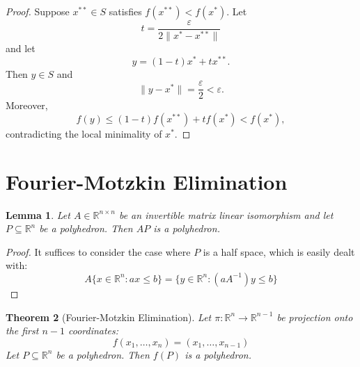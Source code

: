 \documentclass[12pt]{amsart}
\newtheorem{theorem}{Theorem}[section]
\newtheorem{lemma}[theorem]{Lemma}
\theoremstyle{definition}
\theoremstyle{remark}
\numberwithin{equation}{section}
\renewcommand{\epsilon}{\varepsilon}
\newcommand{\RR}{\mathbb{R}}
\begin{document}
\begin{proof}
    Suppose $x^{**}\in S$ satisfies $f(x^{**})< f(x^*)$.
    Let
    \[
        t=\frac\epsilon{2\|x^* - x^{**}\|}
    \]
    and let
    \[
        y = (1-t)x^* + tx^{**}.
    \]
    Then $y\in S$ and 
    \[
        \|y - x^*\| = \frac\epsilon2<\epsilon.
    \]
    Moreover,
    \[
        f(y)\leq (1-t)f(x^{**}) + tf(x^*)< f(x^*),
    \]
    contradicting the local minimality of $x^*$.
\end{proof}



\section{Fourier-Motzkin Elimination}

\begin{lemma}
    Let $A\in\RR^{n\times n}$ be an invertible matrix linear isomorphism and let
    $P\subseteq\RR^n$ be a polyhedron.
    Then $AP$ is a polyhedron.
\end{lemma}

\begin{proof}
    It suffices to consider the case where $P$ is a half space, which
    is easily dealt with:
    \[
        A\{x\in\RR^n : ax\leq b\} = \{y\in\RR^n : (aA^{-1})y\leq b\}
    \]
\end{proof}

\begin{theorem}[Fourier-Motzkin Elimination]
    Let $\pi:\RR^n\to\RR^{n-1}$ be projection onto the first $n-1$
    coordinates:
    \[
        f(x_1,\ldots,x_n) = (x_1,\ldots,x_{n-1})
    \]
    Let $P\subseteq\RR^n$ be a polyhedron.
    Then $f(P)$ is a polyhedron.
\end{theorem}
\end{document}
